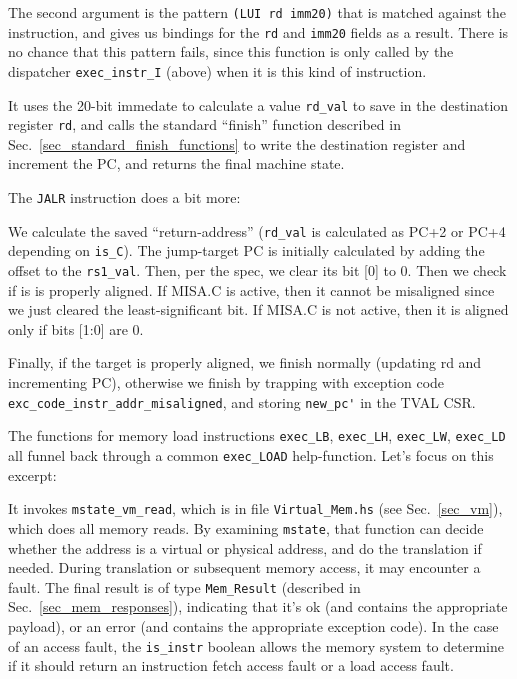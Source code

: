 \documentclass[11pt]{article}
\begin{document}
The second argument is the pattern \verb|(LUI rd imm20)| that is
matched against the instruction, and gives us bindings for the
\verb|rd| and \verb|imm20| fields as a result.  There is no chance
that this pattern fails, since this function is only called by the
dispatcher \verb|exec_instr_I| (above) when it is this kind of
instruction.

It uses the 20-bit immedate to calculate a value \verb|rd_val| to save
in the destination register \verb|rd|, and calls the standard
``finish'' function described in
Sec.~\ref{sec_standard_finish_functions} to write the destination
register and increment the PC, and returns the final machine state.


The \verb|JALR| instruction does a bit more:



We calculate the saved ``return-address'' (\verb|rd_val| is calculated
as PC+2 or PC+4 depending on \verb|is_C|).  The jump-target PC is
initially calculated by adding the offset to the \verb|rs1_val|.
Then, per the spec, we clear its bit [0] to 0.  Then we check if is is
properly aligned. If MISA.C is active, then it cannot be misaligned
since we just cleared the least-significant bit.  If MISA.C is not
active, then it is aligned only if bits [1:0] are 0.

Finally, if the target is properly aligned, we finish normally
(updating rd and incrementing PC), otherwise we finish by trapping
with exception code \verb|exc_code_instr_addr_misaligned|, and storing
\verb|new_pc'| in the TVAL CSR.

The functions for memory load instructions \verb|exec_LB|,
\verb|exec_LH|, \verb|exec_LW|, \verb|exec_LD| all funnel back through
a common \verb|exec_LOAD| help-function.  Let's focus on this excerpt:



It invokes \verb|mstate_vm_read|, which is in file
\verb|Virtual_Mem.hs| (see Sec.~\ref{sec_vm}), which does all memory
reads.  By examining \verb|mstate|, that function can decide whether
the address is a virtual or physical address, and do the translation
if needed.  During translation or subsequent memory access, it may
encounter a fault.  The final result is of type \verb|Mem_Result|
(described in Sec.~\ref{sec_mem_responses}), indicating that it's ok
(and contains the appropriate payload), or an error (and contains the
appropriate exception code).  In the case of an access fault, the
\verb|is_instr| boolean allows the memory system to determine if it
should return an instruction fetch access fault or a load access
fault.
\end{document}
